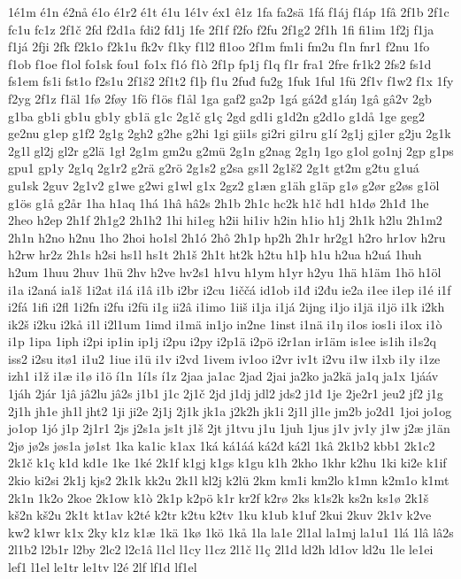 1é1m
é1n
é2nå
é1o
é1r2
é1t
é1u
1é1v
éx1
ê1z
1fa
fa2sä
1fá
f1áj
f1áp
1fâ
2f1b
2f1c
fc1u
fc1z
2f1č
2fd
f2d1a
fdi2
fd1j
1fe
2f1f
f2fo
f2fu
2f1g2
2f1h
1fi
fi1im
1f2j
f1ja
f1já
2fji
2fk
f2k1o
f2k1u
fk2v
f1ky
f1l2
fl1oo
2f1m
fm1i
fm2u
f1n
fnr1
f2nu
1fo
f1ob
f1oe
f1ol
fo1sk
fou1
fo1x
f1ó
f1ò
2f1p
fp1j
f1q
f1r
fra1
2fre
fr1k2
2fs2
fs1d
fs1em
fs1i
fst1o
f2s1u
2f1š2
2f1t2
f1þ
f1u
2fuđ
fu2g
1fuk
1ful
1fü
2f1v
f1w2
f1x
1fy
f2yg
2f1z
f1äl
1fø
2føy
1fö
f1ös
f1ål
1ga
gaf2
ga2p
1gá
gá2đ
g1áŋ
1gâ
gâ2v
2gb
g1ba
gb1i
gb1u
gb1y
gb1ä
g1c
2g1č
g1ç
2gd
gd1i
g1d2n
g2d1o
g1då
1ge
geg2
ge2nu
g1ep
g1f2
2g1g
2gh2
g2he
g2hi
1gi
gii1s
gi2ri
gi1ru
g1í
2g1j
gj1er
g2ju
2g1k
2g1l
gl2j
gl2r
g2lä
1gł
2g1m
gm2u
g2mü
2g1n
g2nag
2g1ŋ
1go
g1ol
go1nj
2gp
g1ps
gpu1
gp1y
2g1q
2g1r2
g2rä
g2rö
2g1s2
g2sa
gs1l
2g1š2
2g1t
gt2m
g2tu
g1uá
gu1sk
2guv
2g1v2
g1we
g2wi
g1wl
g1x
2gz2
g1æn
g1äh
g1äp
g1ø
g2ør
g2øs
g1öl
g1ös
g1å
g2år
1ha
h1aq
1há
1hâ
hâ2s
2h1b
2h1c
hc2k
h1č
hd1
h1dø
2h1đ
1he
2heo
h2ep
2h1f
2h1g2
2h1h2
1hi
hi1eg
h2ii
hi1iv
h2in
h1io
h1j
2h1k
h2lu
2h1m2
2h1n
h2no
h2nu
1ho
2hoi
ho1sl
2h1ó
2hô
2h1p
hp2h
2h1r
hr2g1
h2ro
hr1ov
h2ru
h2rw
hr2z
2h1s
h2si
hs1l
hs1t
2h1š
2h1t
ht2k
h2tu
h1þ
h1u
h2ua
h2uá
1huh
h2um
1huu
2huv
1hü
2hv
h2ve
hv2s1
h1vu
h1ym
h1yr
h2yu
1hä
h1äm
1hö
h1öl
i1a
i2aná
ia1š
1i2at
i1á
i1â
i1b
i2br
i2cu
1iččá
id1ob
i1đ
i2đu
ie2a
i1ee
i1ep
i1é
i1f
i2fá
1ifi
i2fl
1i2fn
i2fu
i2fü
i1g
ii2â
i1imo
1iiš
i1ja
i1já
2ijng
i1jo
i1jä
i1jö
i1k
i2kh
ik2š
i2ku
i2kå
i1l
i2l1um
1imd
i1mä
in1jo
in2ne
1inst
i1nä
i1ŋ
i1os
ios1i
i1ox
i1ò
i1p
1ipa
1iph
i2pi
ip1in
ip1j
i2pu
i2py
i2p1ä
i2pö
i2r1an
ir1äm
is1ee
is1ih
i1s2q
iss2
i2su
itø1
i1u2
1iue
i1ü
i1v
i2vd
1ivem
iv1oo
i2vr
iv1t
i2vu
i1w
i1xb
i1y
i1ze
izh1
i1ž
i1æ
i1ø
i1ö
í1n
1í1s
í1z
2jaa
ja1ac
2jad
2jai
ja2ko
ja2kä
ja1q
ja1x
1jááv
1jáh
2jár
1jâ
jâ2lu
jâ2s
j1b1
j1c
2j1č
2jd
j1dj
jdl2
jds2
j1đ
1je
2je2r1
jeu2
jf2
j1g
2j1h
jh1e
jh1l
jht2
1ji
ji2e
2j1j
2j1k
jk1a
j2k2h
jk1i
2j1l
jl1e
jm2b
jo2d1
1joi
jo1og
jo1op
1jó
j1p
2j1r1
2js
j2s1a
js1t
j1š
2jt
j1tvu
j1u
1juh
1jus
j1v
jv1y
j1w
j2æ
j1än
2jø
jø2s
jøs1a
jø1st
1ka
ka1ic
k1ax
1ká
ká1áá
ká2đ
ká2l
1kâ
2k1b2
kbb1
2k1c2
2k1č
k1ç
k1d
kd1e
1ke
1ké
2k1f
k1gj
k1gs
k1gu
k1h
2kho
1khr
k2hu
1ki
ki2e
k1if
2kio
ki2si
2k1j
kjs2
2k1k
kk2u
2k1l
kl2j
k2lü
2km
km1i
km2lo
k1mn
k2m1o
k1mt
2k1n
1k2o
2koe
2k1ow
k1ò
2k1p
k2pö
k1r
kr2f
k2rø
2ks
k1s2k
ks2n
ks1ø
2k1š
kš2n
kš2u
2k1t
kt1av
k2té
k2tr
k2tu
k2tv
1ku
k1ub
k1uf
2kui
2kuv
2k1v
k2ve
kw2
k1wr
k1x
2ky
k1z
k1æ
1kä
1kø
1kö
1kå
1la
la1e
2l1al
la1mj
la1u1
1lá
1lâ
lâ2s
2l1b2
l2b1r
l2by
2lc2
l2c1â
l1cl
l1cy
l1cz
2l1č
l1ç
2l1d
ld2h
ld1ov
ld2u
1le
le1ei
lef1
l1el
le1tr
le1tv
l2é
2lf
lf1d
lf1el
